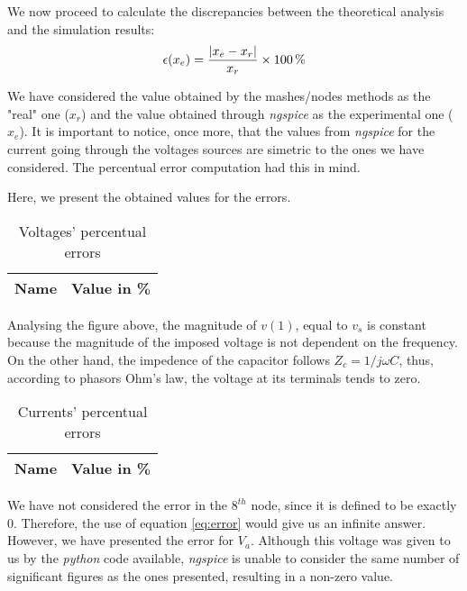 \par
We now proceed to calculate the discrepancies between the theoretical analysis and the simulation results:
\begin{equation}
  \centering
  \epsilon (x_e)=\frac{|x_e-x_r|}{x_r} \times 100\,\%
  \label{eq:error}
\end{equation}

We have considered the value obtained by the mashes/nodes methods as the "real" one ($x_r$) and the value obtained through \emph{ngspice} as the experimental one ($x_e$). It is important to notice, once more, that the values from \emph{ngspice} for the current going through the voltages sources are simetric to the ones we have considered. The percentual error computation had this in mind.

Here, we present the obtained values for the errors.

\begin{table}[H]
  \centering
  \begin{tabular}{|l|r|}
    \hline
    {\bf Name} & {\bf Value in \%} \\ \hline
  \end{tabular}
  \caption{Voltages' percentual errors}
  \label{tab:error_tensoes}
\end{table}

Analysing the figure above, the magnitude of $v(1)$, equal to $v_s$ is constant because the magnitude of the imposed voltage is not dependent on the frequency. On the other hand, the impedence of the capacitor follows $Z_c = 1/j\omega C$, thus, according to phasors Ohm's law, the voltage at its terminals tends to zero. 

\begin{table}[H]
  \centering
  \begin{tabular}{|l|r|}
    \hline
    {\bf Name} & {\bf Value in \%} \\ \hline
  \end{tabular}
  \caption{Currents' percentual errors }
  \label{tab:error_current}
\end{table}

We have not considered the error in the $8^{th}$ node, since it is defined to be exactly 0. Therefore, the use of equation \ref{eq:error} would give us an infinite answer. However, we have presented the error for $V_a$. Although this voltage was given to us by the \emph{python} code available, \emph{ngspice} is unable to consider the same number of significant figures as the ones presented, resulting in a non-zero value.
